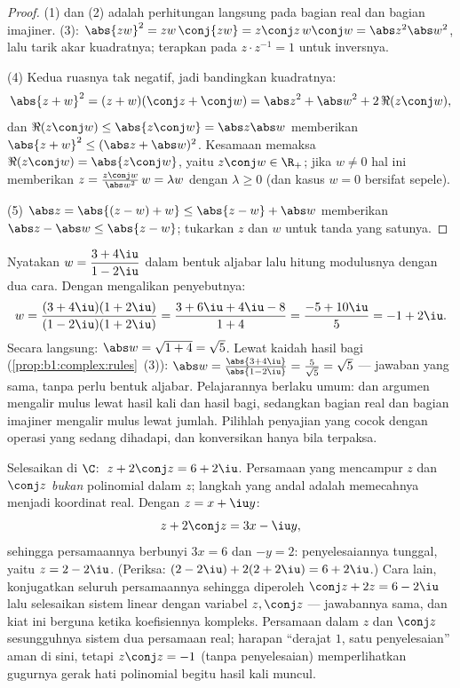 \begin{proof}
(1) dan (2) adalah perhitungan langsung pada bagian real dan bagian imajiner. (3):
$\abs{zw}^2 = zw\,\conj{zw} = z\conj z\, w \conj w = \abs z^2 \abs
w^2$, lalu tarik akar kuadratnya; terapkan pada $z \cdot z^{-1} = 1$ untuk
inversnya.

(4) Kedua ruasnya tak negatif, jadi bandingkan kuadratnya:
\[
\abs{z+w}^2 = (z+w)(\conj z + \conj w)
= \abs z^2 + \abs w^2 + 2\,\Re(z \conj w),
\]
dan $\Re(z\conj w) \leq \abs{z \conj w} = \abs z \abs w$ memberikan
$\abs{z+w}^2 \leq (\abs z + \abs w)^2$. Kesamaan memaksa $\Re(z \conj
w) = \abs{z \conj w}$, yaitu $z \conj w \in \R_+$; jika $w \neq 0$ hal ini
memberikan $z = \frac{z\conj w}{\abs w^2}\, w = \lambda w$ dengan $\lambda
\geq 0$ (dan kasus $w = 0$ bersifat sepele).

(5) $\abs z = \abs{(z - w) + w} \leq \abs{z-w} + \abs w$ memberikan $\abs z
- \abs w \leq \abs{z - w}$; tukarkan $z$ dan $w$ untuk tanda yang satunya.
\end{proof}

\begin{example}\label{ex:b1:complex:workout}
Nyatakan $w = \dfrac{3 + 4\iu}{1 - 2\iu}$ dalam bentuk aljabar lalu hitung
modulusnya dengan dua cara. Dengan mengalikan 
penyebutnya:
\[
w = \frac{(3 + 4\iu)(1 + 2\iu)}{(1 - 2\iu)(1 + 2\iu)}
= \frac{3 + 6\iu + 4\iu - 8}{1 + 4}
= \frac{-5 + 10\iu}{5} = -1 + 2\iu .
\]
Secara langsung: $\abs w = \sqrt{1 + 4} = \sqrt5$. Lewat kaidah hasil bagi
(\cref{prop:b1:complex:rules}~(3)): $\abs w = \frac{\abs{3 +
4\iu}}{\abs{1 - 2\iu}} = \frac5{\sqrt5} = \sqrt5$ --- jawaban yang sama,
tanpa perlu bentuk aljabar. Pelajarannya berlaku umum:  dan
argumen mengalir mulus lewat hasil kali dan hasil bagi, sedangkan
bagian real dan bagian imajiner mengalir mulus lewat jumlah. Pilihlah
penyajian yang cocok dengan operasi yang sedang dihadapi, dan konversikan
hanya bila terpaksa.
\end{example}

\begin{example}\label{ex:b1:complex:conjeq}
Selesaikan di $\C$: $\;z + 2\conj z = 6 + 2\iu$. Persamaan yang mencampur $z$
dan $\conj z$ \emph{bukan} polinomial dalam $z$; langkah yang
andal adalah memecahnya menjadi koordinat real. Dengan $z = x + \iu y$:
\[
z + 2\conj z = 3x - \iu y ,
\]
sehingga persamaannya berbunyi $3x = 6$ dan $-y = 2$: penyelesaiannya tunggal,
yaitu $z = 2 - 2\iu$. (Periksa: $(2 - 2\iu) + 2(2 + 2\iu) = 6 +
2\iu$.) Cara lain, konjugatkan seluruh persamaannya sehingga diperoleh
$\conj z + 2z = 6 - 2\iu$ lalu selesaikan sistem linear dengan
variabel $z, \conj z$ --- jawabannya sama, dan kiat ini berguna ketika
koefisiennya kompleks. Persamaan dalam $z$ dan $\conj z$ sesungguhnya
sistem dua persamaan real; harapan ``derajat $1$, satu
penyelesaian'' aman di sini, tetapi $z\conj z = -1$ (tanpa penyelesaian) memperlihatkan
gugurnya gerak hati polinomial begitu hasil kali muncul.
\end{example}

